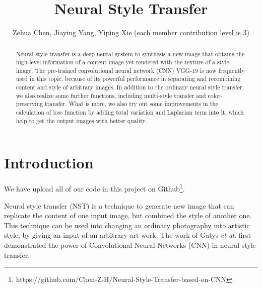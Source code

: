 \documentclass[runningheads]{llncs}
\begin{document}
\pagestyle{headings}
\mainmatter
\def\ECCV16SubNumber{***}  %

\title{Neural Style Transfer} %



\author{Zehua Chen, Jiaying Yang, Yiping Xie (each member contribution level is 3)}


\maketitle

\begin{abstract}
Neural style transfer is a deep neural system to synthesis a new image that obtains the high-level information of a content image yet rendered with the texture of a style image. The pre-trained convolutional neural network (CNN) VGG-19 is now frequently used in this topic, because of its powerful performance in separating and recombining content and style of arbitrary images. In addition to the ordinary neural style transfer, we also realize some further functions, including multi-style transfer and color-preserving transfer. What is more, we also try out some improvements in the calculation of loss function by adding total variation and Laplacian term into it, which help to get the output images with better quality.
\end{abstract}


\section{Introduction}
We have upload all of our code in this project on Github\footnote{https://github.com/Chen-Z-H/Neural-Style-Transfer-based-on-CNN}. 

Neural style transfer (NST) is a technique to generate new image that can replicate the content of one input image, but combined the style of another one. This technique can be used into changing an ordinary photography into artistic style, by giving an input of an arbitrary art work. The work of Gatys \textit{et al.}\cite{GatysLeon2016ANAo} first demonstrated the power of Convolutional Neural Networks (CNN) in neural style transfer.
\end{document}
